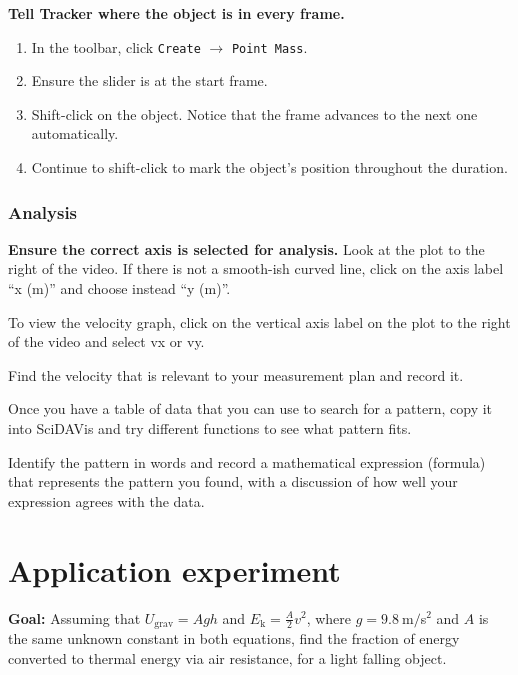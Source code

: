 \begin{steps}
	\item \textbf{Tell Tracker where the object is in every frame.}
	\begin{enumerate}
		\item In the toolbar, click \texttt{Create} $\rightarrow$ \texttt{Point Mass}.
		\item Ensure the slider is at the start frame.
		\item Shift-click on the object. Notice that the frame advances to the next one automatically.
		\item Continue to shift-click to mark the object's position throughout the duration.
	\end{enumerate}
\end{steps}

\subsubsection{Analysis}

\begin{steps}
	\item \textbf{Ensure the correct axis is selected for analysis.} Look at the plot to the right of the video. If there is not a smooth-ish curved line, click on the axis label ``x (m)'' and choose instead ``y (m)''.
	
	\item To view the velocity graph, click on the vertical axis label on the plot to the right of the video and select vx or vy.
	
	\item Find the velocity that is relevant to your measurement plan and record it.
	
	\item Once you have a table of data that you can use to search for a pattern, copy it into SciDAVis and try different functions to see what pattern fits.
	
	\item Identify the pattern in words and record a mathematical expression (formula) that represents the pattern you found, with a discussion of how well your expression agrees with the data.
\end{steps}

\section{Application experiment}

\textbf{Goal:} Assuming that $U_\mathrm{grav} = Agh$ and $E_\mathrm{k} = \frac{A}{2} v^2$, where $g = 9.8\:$m$/$s$^2$ and $A$ is the same unknown constant in both equations, find the fraction of energy converted to thermal energy via air resistance, for a light falling object.

